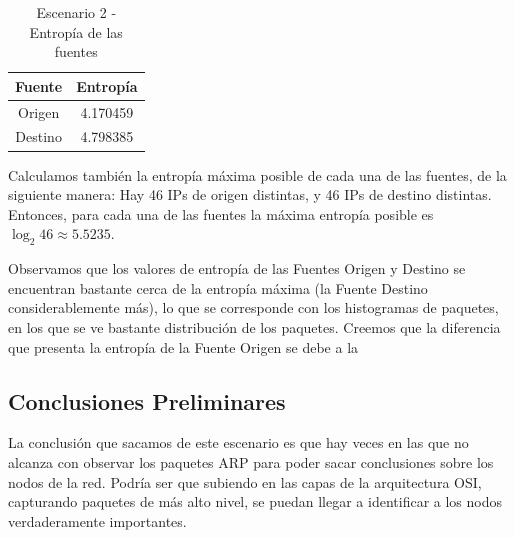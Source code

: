     \begin{table}[!htb]
		\caption{Escenario 2 - Entropía de las fuentes}
		\centering
		\begin{tabular}{c c}
          Fuente & Entropía \\
          \hline 
          Origen & 4.170459 \\ 
          Destino & 4.798385 \\   
  		\end{tabular}
  	\end{table}
	\par Calculamos también la entropía máxima posible de cada una de las fuentes, de la siguiente manera: Hay 46 IPs de origen distintas, y 46 IPs de destino distintas. Entonces, para cada una de las fuentes la máxima entropía posible es $\log_2{46} \approx 5.5235. $
	\par Observamos que los valores de entropía de las Fuentes Origen y Destino se encuentran bastante cerca de la entropía máxima (la Fuente Destino considerablemente más), lo que se corresponde con los histogramas de paquetes, en los que se ve bastante distribución de los paquetes. Creemos que la diferencia que presenta la entropía de la Fuente Origen se debe a la

\subsection{Conclusiones Preliminares}
	\par La conclusión que sacamos de este escenario es que hay veces en las que no alcanza con observar los paquetes ARP para poder sacar conclusiones sobre los nodos de la red. Podría ser que subiendo en las capas de la arquitectura OSI, capturando paquetes de más alto nivel, se puedan llegar a identificar a los nodos verdaderamente importantes. 
